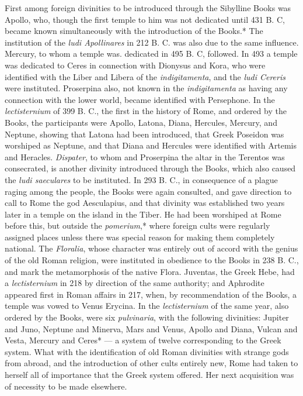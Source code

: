 \documentclass[a4paper, 11pt, oneside, polutonikogreek, english]{article}
\begin{document}
First among foreign divinities to be introduced through the Sibylline Books was Apollo, who, though the first temple to him was not dedicated until 431 B. C, became known simultaneously with the introduction of the Books.* The institution of the \emph{ludi Apollinares} in 212 B. C. was also due to the same influence. Mercury, to whom a temple was. dedicated in 495 B. C, followed. In 493 a temple was dedicated to Ceres in connection with Dionysus and Kora, who were identified with the Liber and Libera of the \emph{indigitamenta}, and the \emph{ludi Cereris} were instituted. Proserpina also, not known in the \emph{indigitamenta} as having any connection with the lower world, became identified with Persephone. In the \emph{lectisternium} of 399 B. C., the first in the history of Rome, and ordered by the Books, the participants were Apollo, Latona, Diana, Hercules, Mercury, and Neptune, showing that Latona had been introduced, that Greek Poseidon was worshiped as Neptune, and that Diana and Hercules were identified with Artemis and Heracles. \emph{Dispater}, to whom and Proserpina the altar in the Terentos was consecrated, is another divinity introduced through the Books, which also caused the \emph{ludi saeculares} to be instituted. In 293 B. C., in consequence of a plague raging among the people, the Books were again consulted, and gave direction to call to Rome the god Aesculapius, and that divinity was established two years later in a temple on the island in the Tiber. He had been worshiped at Rome before this, but outside the \emph{pomerium},* where foreign cults were regularly assigned places unless there was special reason for making them completely national. The \emph{Floralia}, whose character was entirely out of accord with the genius of the old Roman religion, were instituted in obedience to the Books in 238 B. C., and mark the metamorphosis of the native Flora. Juventas, the Greek Hebe, had a \emph{lectisternium} in 218 by direction of the same authority; and Aphrodite appeared first in Roman affairs in 217, when, by recommendation of the Books, a temple was vowed to Venus Erycina. In the \emph{lectisternium} of the same year, also ordered by the Books, were six \emph{pulvinaria}, with the following divinities: Jupiter and Juno, Neptune and Minerva, Mars and Venus, Apollo and Diana, Vulcan and Vesta, Mercury and Ceres* --- a system of twelve corresponding to the Greek system. What with the identification of old Roman divinities with strange gods from abroad, and the introduction of other cults entirely new, Rome had taken to herself all of importance that the Greek system offered. Her next acquisition was of necessity to be made elsewhere.
\end{document}
